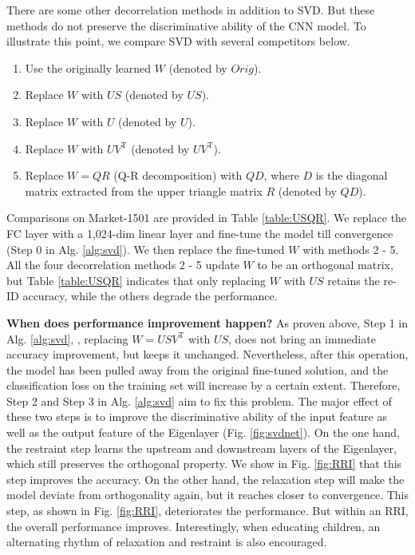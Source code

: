 \documentclass[10pt,twocolumn,letterpaper]{article}
\begin{document}
There are some other decorrelation methods in addition to SVD. But these methods do not preserve the discriminative ability of the CNN model. To illustrate this point, we compare SVD with several competitors below. 
\begin{enumerate}
\setlength{\itemsep}{0.4ex} %
\item Use the originally learned $W$ (denoted by $Orig$).
\item Replace $W$ with $US$ (denoted by $US$).
\item Replace $W$ with $U$ (denoted by $U$).
\item Replace $W$ with $UV^\mathrm{T}$ (denoted by $UV^\mathrm{T}$).
\item  Replace $W=QR$ (Q-R decomposition) with $QD$, where $D$ is the diagonal matrix extracted from the upper triangle matrix $R$ (denoted by $QD$).
\end{enumerate}

Comparisons on Market-1501 \cite{DBLP:conf/iccv/ZhengSTWWT15} are provided in Table \ref{table:USQR}. We replace the FC layer with a 1,024-dim linear layer and fine-tune the model till convergence (Step 0 in Alg. \ref{alg:svd}). We then replace the fine-tuned $W$ with methods 2 - 5. All the four decorrelation methods 2 - 5 update $W$ to be an orthogonal matrix, but Table \ref{table:USQR} indicates that only replacing $W$ with $US$ retains the re-ID accuracy,  while the others degrade the performance.

\textbf{When does performance improvement happen?} As proven above, Step 1 in Alg. \ref{alg:svd}, \ie, replacing $W=USV^\mathrm{T}$ with $US$, does not bring an immediate accuracy improvement, but keeps it unchanged. Nevertheless, after this operation, the model has been pulled away from the original fine-tuned solution, and the classification loss on the training set will increase by a certain extent. 
Therefore, Step 2 and Step 3 in Alg. \ref{alg:svd} aim to fix this problem. The major effect of these two steps is to improve the discriminative ability of the input feature as well as the output feature of the Eigenlayer (Fig. \ref{fig:svdnet}). 
On the one hand, the restraint step learns the upstream and downstream layers of the Eigenlayer, which still preserves the orthogonal property. We show in Fig. \ref{fig:RRI} that this step improves the accuracy. On the other hand, the relaxation step will make the model deviate from orthogonality again, but it reaches closer to convergence. This step, as shown in Fig. \ref{fig:RRI}, deteriorates the performance. But within an RRI, the overall performance improves. Interestingly, when educating children, an alternating rhythm of relaxation and restraint is also encouraged.
\end{document}
